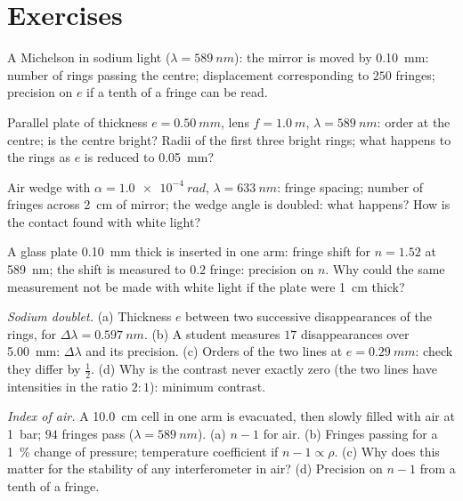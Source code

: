 \section{Exercises}

\begin{exercise}[$\star$]\label{exo:b2:michelson:1}
A Michelson in sodium light ($\lambda = \qty{589}{nm}$): the mirror is moved by
\qty{0.10}{mm}: number of rings passing the centre; displacement
corresponding to $250$ fringes; precision on $e$ if a tenth of a fringe
can be read.
\end{exercise}

\begin{exercise}[$\star$]\label{exo:b2:michelson:2}
Parallel plate of thickness $e = \qty{0.50}{mm}$, lens $f = \qty{1.0}{m}$, $\lambda =
\qty{589}{nm}$: order at the centre; is the centre bright? Radii of the
first three bright rings; what happens to the rings as $e$ is reduced
to \qty{0.05}{mm}?
\end{exercise}

\begin{exercise}[$\star$]\label{exo:b2:michelson:3}
Air wedge with $\alpha = \qty{1.0e-4}{rad}$, $\lambda = \qty{633}{nm}$: fringe spacing;
number of fringes across \qty{2}{cm} of mirror; the wedge angle is
doubled: what happens? How is the contact found with white light?
\end{exercise}

\begin{exercise}[$\star$]\label{exo:b2:michelson:4}
A glass plate \qty{0.10}{mm} thick is inserted in one arm: fringe shift for
$n = 1.52$ at \qty{589}{nm}; the shift is measured to $0.2$ fringe: precision
on $n$. Why could the same measurement not be made with white light
if the plate were \qty{1}{cm} thick?
\end{exercise}

\begin{exercise}[$\star\star$]\label{exo:b2:michelson:5}
\emph{Sodium doublet.} (a) Thickness $e$ between two successive
disappearances of the rings, for $\Delta\lambda = \qty{0.597}{nm}$. (b) A student
measures $17$ disappearances over \qty{5.00}{mm}: $\Delta\lambda$ and its precision.
(c) Orders of the two lines at $e = \qty{0.29}{mm}$: check they differ by
$\tfrac12$. (d) Why is the contrast never exactly zero (the two lines have
intensities in the ratio $2 : 1$): minimum contrast.
\end{exercise}

\begin{exercise}[$\star\star$]\label{exo:b2:michelson:6}
\emph{Index of air.} A \qty{10.0}{cm} cell in one arm is evacuated, then
slowly filled with air at \qty{1}{bar}; $94$ fringes pass ($\lambda = \qty{589}{nm}$).
(a) $n - 1$ for air. (b) Fringes passing for a \qty{1}{\%} change of
pressure; temperature coefficient if $n - 1 \propto \rho$. (c) Why does this
matter for the stability of any interferometer in air? (d) Precision on
$n - 1$ from a tenth of a fringe.
\end{exercise}

